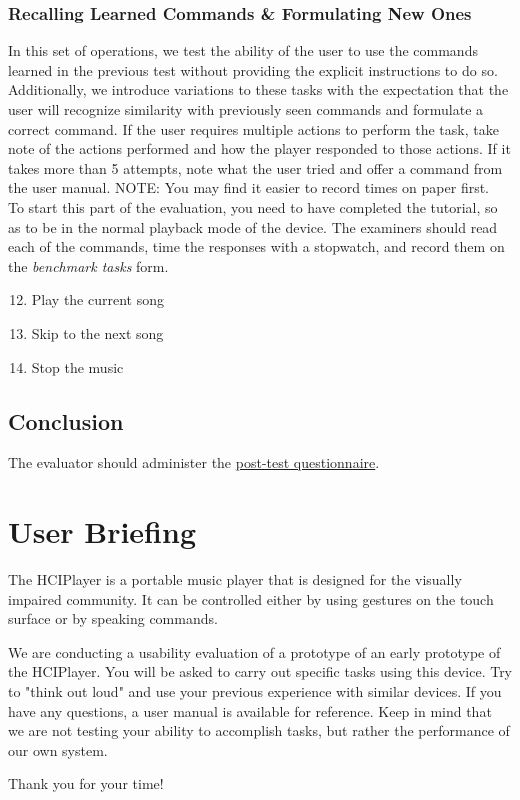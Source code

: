 \documentclass[12pt,letterpaper]{article}
\begin{document}
\subsubsection{Recalling Learned Commands \& Formulating New Ones}
In this set of operations, we test the ability of the user to use the commands learned in the previous test without providing the explicit instructions to do so. Additionally, we introduce variations to these tasks with the expectation that the user will recognize similarity with previously seen commands and formulate a correct command. If the user requires multiple actions to perform the task, take note of the actions performed and how the player responded to those actions. If it takes more than 5 attempts, note what the user tried and offer a command from the user manual. NOTE: You may find it easier to record times on paper first. \\
To start this part of the evaluation, you need to have completed the tutorial, so as to be in the normal playback mode of the device. The examiners should read each of the commands, time the responses with a stopwatch, and record them on the \emph{benchmark tasks} form.
\begin{enumerate}
\setcounter{enumi}{11}
\item Play the current song
\item Skip to the next song
\item Stop the music
\end{enumerate}

\subsection{Conclusion}

The evaluator should administer the \href{http://fluidsurveys.com/s/hciplayer-posttest/}{post-test questionnaire}.

\section{User Briefing}

The HCIPlayer is a portable music player that is designed for the visually impaired community. It can be controlled either by using gestures on the touch surface or by speaking commands.

We are conducting a usability evaluation of a prototype of an early prototype of the HCIPlayer. You will be asked to carry out specific tasks using this device. Try to "think out loud" and use your previous experience with similar devices. If you have any questions, a user manual is available for reference. Keep in mind that we are not testing your ability to accomplish tasks, but rather the performance of our own system.

Thank you for your time!
\end{document}
